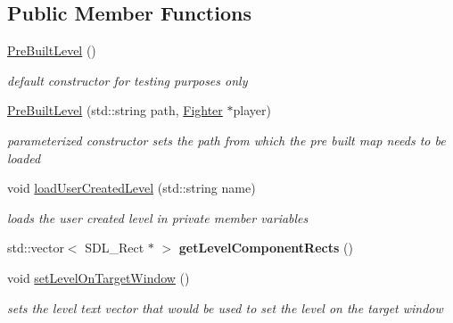 \subsection*{Public Member Functions}
\begin{DoxyCompactItemize}
\item 
\hypertarget{class_pre_built_level_a86e618ddeb7a0ca8484f268dc927819d}{}\label{class_pre_built_level_a86e618ddeb7a0ca8484f268dc927819d} 
\hyperlink{class_pre_built_level_a86e618ddeb7a0ca8484f268dc927819d}{Pre\+Built\+Level} ()
\begin{DoxyCompactList}\small\item\em default constructor for testing purposes only \end{DoxyCompactList}\item 
\hypertarget{class_pre_built_level_abf37d637c8cea3dfa78adc4ee066a8be}{}\label{class_pre_built_level_abf37d637c8cea3dfa78adc4ee066a8be} 
\hyperlink{class_pre_built_level_abf37d637c8cea3dfa78adc4ee066a8be}{Pre\+Built\+Level} (std\+::string path, \hyperlink{class_fighter}{Fighter} $\ast$player)
\begin{DoxyCompactList}\small\item\em parameterized constructor sets the path from which the pre built map needs to be loaded \end{DoxyCompactList}\item 
\hypertarget{class_pre_built_level_aab6e5f41f2e67cb0c2af129dae067560}{}\label{class_pre_built_level_aab6e5f41f2e67cb0c2af129dae067560} 
void \hyperlink{class_pre_built_level_aab6e5f41f2e67cb0c2af129dae067560}{load\+User\+Created\+Level} (std\+::string name)
\begin{DoxyCompactList}\small\item\em loads the user created level in private member variables \end{DoxyCompactList}\item 
\hypertarget{class_pre_built_level_af3fec0bf964834a5330187d6b5696fee}{}\label{class_pre_built_level_af3fec0bf964834a5330187d6b5696fee} 
std\+::vector$<$ S\+D\+L\+\_\+\+Rect $\ast$ $>$ {\bfseries get\+Level\+Component\+Rects} ()
\item 
\hypertarget{class_pre_built_level_ae3464cc581f730e739cc41ea43ae8e03}{}\label{class_pre_built_level_ae3464cc581f730e739cc41ea43ae8e03} 
void \hyperlink{class_pre_built_level_ae3464cc581f730e739cc41ea43ae8e03}{set\+Level\+On\+Target\+Window} ()
\begin{DoxyCompactList}\small\item\em sets the level text vector that would be used to set the level on the target window \end{DoxyCompactList}\item 

\end{DoxyCompactItemize}
